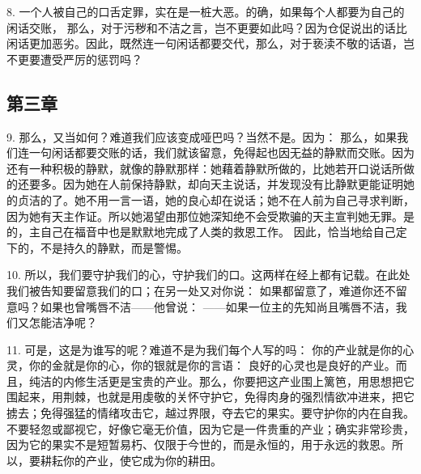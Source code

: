 8. 一个人被自己的口舌定罪，实在是一桩大恶。的确，如果每个人都要为自己的闲话交账， 那么，对于污秽和不洁之言，岂不更要如此吗？因为仓促说出的话比闲话更加恶劣。因此，既然连一句闲话都要交代，那么，对于亵渎不敬的话语，岂不更要遭受严厉的惩罚吗？\par


\subsection{第三章}

\par

9. 那么，又当如何？难道我们应该变成哑巴吗？当然不是。因为：  那么，如果我们连一句闲话都要交账的话，我们就该留意，免得起也因无益的静默而交账。因为还有一种积极的静默，就像的静默那样：她藉着静默所做的，比她若开口说话所做的还要多。因为她在人前保持静默，却向天主说话，并发现没有比静默更能证明她的贞洁的了。她不用一言一语，她的良心却在说话；她不在人前为自己寻求判断，因为她有天主作证。所以她渴望由那位她深知绝不会受欺骗的天主宣判她无罪。是的，主自己在福音中也是默默地完成了人类的救恩工作。 因此，恰当地给自己定下的，不是持久的静默，而是警惕。\par

10. 所以，我们要守护我们的心，守护我们的口。这两样在经上都有记载。在此处我们被告知要留意我们的口；在另一处又对你说：  如果都留意了，难道你还不留意吗？如果也曾嘴唇不洁——他曾说：  ——如果一位主的先知尚且嘴唇不洁，我们又怎能洁净呢？\par

11. 可是，这是为谁写的呢？难道不是为我们每个人写的吗：  你的产业就是你的心灵，你的金就是你的心，你的银就是你的言语： 良好的心灵也是良好的产业。而且，纯洁的内修生活更是宝贵的产业。那么，你要把这产业围上篱笆，用思想把它围起来，用荆棘，也就是用虔敬的关怀守护它，免得肉身的强烈情欲冲进来，把它掳去；免得强猛的情绪攻击它，越过界限，夺去它的果实。要守护你的内在自我。不要轻忽或鄙视它，好像它毫无价值，因为它是一件贵重的产业；确实非常珍贵，因为它的果实不是短暂易朽、仅限于今世的，而是永恒的，用于永远的救恩。所以，要耕耘你的产业，使它成为你的耕田。\par

